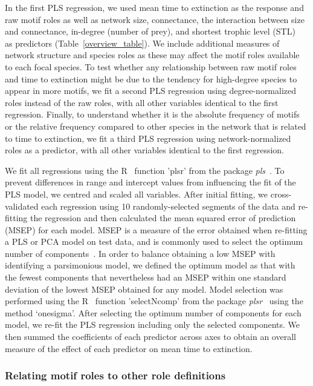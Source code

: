 \documentclass[12pt]{article}
\begin{document}
\begin{spacing}{2.0}
			
			In the first PLS regression, we used mean time to extinction as the response and raw motif roles as well as network size, connectance, the interaction between size and connectance, in-degree (number of prey), and shortest trophic level (STL)~\citep{Hairston1993} as predictors (Table~\ref{overview_table}).
			We include additional measures of network structure and species roles as these may affect the motif roles available to each focal species.
			To test whether any relationship between raw motif roles and time to extinction might be due to the tendency for high-degree species to appear in more motifs, we fit a second PLS regression using degree-normalized roles instead of the raw roles, with all other variables identical to the first regression.
			Finally, to understand whether it is the absolute frequency of motifs or the relative frequency compared to other species in the network that is related to time to extinction, we fit a third PLS regression using network-normalized roles as a predictor, with all other variables identical to the first regression.
			
			
			We fit all regressions using the R~\citep{R} function 'plsr' from the package \emph{pls}~\citep{pls}.
			To prevent differences in range and intercept values from influencing the fit of the PLS model, we centred and scaled all variables.
			After initial fitting, we cross-validated each regression using 10 randomly-selected segments of the data and re-fitting the regression and then calculated the mean squared error of prediction (MSEP) for each model.
			MSEP is a measure of the error obtained when re-fitting a PLS or PCA model on test data, and is commonly used to select the optimum number of components~\citep{Mevik2004}.
			In order to balance obtaining a low MSEP with identifying a parsimonious model, we defined the optimum model as that with the fewest components that nevertheless had an MSEP within one standard deviation of the lowest MSEP obtained for any model.
			Model selection was performed using the R~\citep{R} function 'selectNcomp' from the package \emph{plsr}~\citep{pls} using the method `onesigma'.
			After selecting the optimum number of components for each model, we re-fit the PLS regression including only the selected components. 
			We then summed the coefficients of each predictor across axes to obtain an overall measure of the effect of each predictor on mean time to extinction.


		\subsubsection*{Relating motif roles to other role definitions}
		

\end{spacing}
\end{document}
